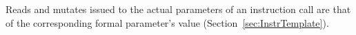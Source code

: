 
Reads and mutates issued to the actual parameters of an instruction call are that of the corresponding formal parameter's  value (Section~\ref{sec:InstrTemplate}).

